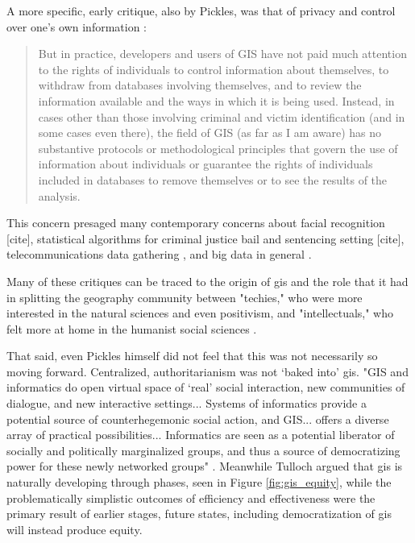A more specific, early critique, also by Pickles, was that of privacy and control over one's own information \cite{picklesToolScienceGIS1997}:

\blockquote{But in practice, developers and users of GIS have not paid much attention to the rights of individuals to control information about themselves, to withdraw from databases involving themselves, and to review the information available and the ways in which it is being used. Instead, in cases other than those involving criminal and victim identification (and in some cases even there), the field of GIS (as far as I am aware) has no substantive protocols or methodological principles that govern the use of information about individuals or guarantee the rights of individuals included in databases to remove themselves or to see the results of the analysis.}

This concern presaged many contemporary concerns about facial recognition [cite], statistical algorithms for criminal justice bail and sentencing setting [cite], telecommunications data gathering \cite{mcdonaldEbolaBigData2016}, and big data in general \cite{boydCriticalQuestionsBig2012}.

Many of these critiques can be traced to the origin of \ac{gis} and the role that it had in splitting the geography community between "techies," who were more interested in the natural sciences and even positivism, and "intellectuals," who felt more at home in the humanist social sciences \cite{sheppardGISSocietyResearch1995}.

That said, even Pickles himself did not feel that this was not necessarily so moving forward. Centralized, authoritarianism was not `baked into' \ac{gis}. "GIS and informatics do open virtual space of `real' social interaction, new communities of dialogue, and new interactive settings... Systems of informatics provide a potential source of counterhegemonic social action, and GIS... offers a diverse array of practical possibilities... Informatics are seen as a potential liberator of socially and politically marginalized groups, and thus a source of democratizing power for these newly networked groups" \cite{picklesRepresentationsElectronicAge1994}. Meanwhile Tulloch argued that \ac{gis} is naturally developing through phases, seen in Figure \ref{fig:gis_equity}, while the problematically simplistic outcomes of efficiency and effectiveness were the primary result of earlier stages, future states, including democratization of \ac{gis} will instead produce equity. 

